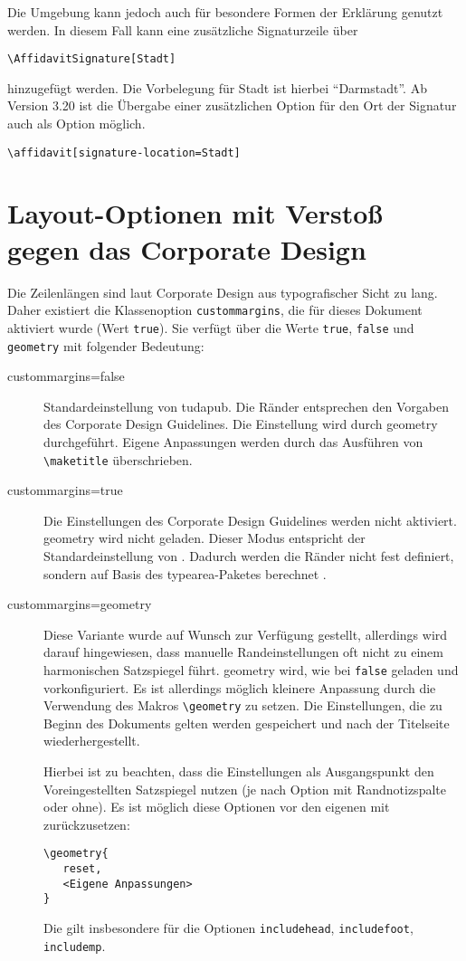 \documentclass[
	german,%
	ruledheaders=section,%
	class=report,%
	thesis={type=bachelor},%
	accentcolor=9c,%
	custommargins=true,%
	marginpar=false,%
	parskip=half-,%
	fontsize=11pt,%
]{tudapub}
\let\code\texttt
\let\pck\textsf
\let\cls\textsf
\begin{document}
Die Umgebung kann jedoch auch für besondere Formen der Erklärung genutzt werden. In diesem Fall kann eine zusätzliche Signaturzeile über
\begin{verbatim}
\AffidavitSignature[Stadt]
\end{verbatim}
hinzugefügt werden. Die Vorbelegung für Stadt ist hierbei \enquote{Darmstadt}.
Ab Version 3.20 ist die Übergabe einer zusätzlichen Option für den Ort der Signatur auch als Option möglich.

\begin{verbatim}
\affidavit[signature-location=Stadt]
\end{verbatim}

\section{Layout-Optionen mit Verstoß gegen das Corporate Design}

Die Zeilenlängen sind laut Corporate Design aus typografischer Sicht zu lang.
Daher existiert die Klassenoption \code{custommargins}, die für dieses Dokument aktiviert wurde (Wert \code{true}). Sie verfügt über die Werte \code{true}, \code{false} und \code{geometry} mit folgender Bedeutung:

\begin{description}
	\item[custommargins=false] Standardeinstellung von \cls{tudapub}. Die Ränder entsprechen den Vorgaben des Corporate Design Guidelines. Die Einstellung wird durch \pck{geometry} durchgeführt. Eigene Anpassungen werden durch das Ausführen von \code{\textbackslash{}maketitle} überschrieben.
	\item[custommargins=true] Die Einstellungen des Corporate Design Guidelines werden nicht aktiviert. \pck{geometry} wird nicht geladen. Dieser Modus entspricht der Standardeinstellung von \KOMAScript{}. Dadurch werden die Ränder nicht fest definiert, sondern auf Basis des \pck{typearea}-Paketes berechnet \cite[vgl.][]{scrguide}.
	\item[custommargins=geometry]  Diese Variante wurde auf Wunsch zur Verfügung gestellt, allerdings wird darauf hingewiesen, dass manuelle Randeinstellungen oft nicht zu einem harmonischen Satzspiegel führt.
	      \pck{geometry} wird, wie bei \code{false} geladen und vorkonfiguriert. Es ist allerdings möglich kleinere Anpassung durch die Verwendung des Makros \code{\textbackslash{}geometry} zu setzen. Die Einstellungen, die zu Beginn des Dokuments gelten werden gespeichert und nach der Titelseite wiederhergestellt.

	      Hierbei ist zu beachten, dass die Einstellungen als Ausgangspunkt den Voreingestellten Satzspiegel nutzen (je nach Option mit Randnotizspalte oder ohne). Es ist möglich diese Optionen vor den eigenen mit zurückzusetzen:
\begin{verbatim}
\geometry{
   reset,
   <Eigene Anpassungen>
}
\end{verbatim}
	      Die gilt insbesondere für die Optionen \code{includehead}, \code{includefoot}, \code{includemp}.
\end{description}
\end{document}
